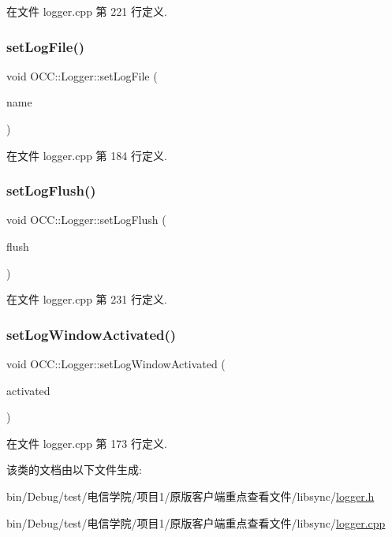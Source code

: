 在文件 logger.\+cpp 第 221 行定义.

\mbox{\label{class_o_c_c_1_1_logger_a3ee77b95d847f36b5b7624ea3e26e09b}} 
\subsubsection{\texorpdfstring{set\+Log\+File()}{setLogFile()}}
{\footnotesize\ttfamily void O\+C\+C\+::\+Logger\+::set\+Log\+File (\begin{DoxyParamCaption}\item[{const Q\+String \&}]{name }\end{DoxyParamCaption})}



在文件 logger.\+cpp 第 184 行定义.

\mbox{\label{class_o_c_c_1_1_logger_ad7c9b0652108171214c9158e12f3f61b}} 
\subsubsection{\texorpdfstring{set\+Log\+Flush()}{setLogFlush()}}
{\footnotesize\ttfamily void O\+C\+C\+::\+Logger\+::set\+Log\+Flush (\begin{DoxyParamCaption}\item[{bool}]{flush }\end{DoxyParamCaption})}



在文件 logger.\+cpp 第 231 行定义.

\mbox{\label{class_o_c_c_1_1_logger_ad3d820118bdd5a873f084e978289b5ab}} 
\subsubsection{\texorpdfstring{set\+Log\+Window\+Activated()}{setLogWindowActivated()}}
{\footnotesize\ttfamily void O\+C\+C\+::\+Logger\+::set\+Log\+Window\+Activated (\begin{DoxyParamCaption}\item[{bool}]{activated }\end{DoxyParamCaption})}



在文件 logger.\+cpp 第 173 行定义.



该类的文档由以下文件生成\+:\begin{DoxyCompactItemize}
\item 
bin/\+Debug/test/电信学院/项目1/原版客户端重点查看文件/libsync/\hyperlink{logger_8h}{logger.\+h}\item 
bin/\+Debug/test/电信学院/项目1/原版客户端重点查看文件/libsync/\hyperlink{logger_8cpp}{logger.\+cpp}\end{DoxyCompactItemize}
